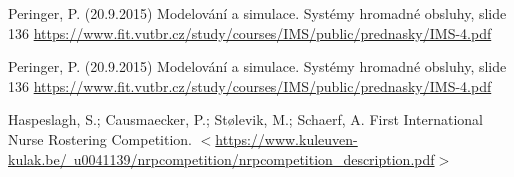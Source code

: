 \documentclass[a4paper, 14pt]{article}
\begin{document}
\begin{thebibliography}{9}
 	Peringer, P. (20.9.2015) Modelování a simulace. Systémy hromadné obsluhy, slide 136
	 \href{https://www.fit.vutbr.cz/study/courses/IMS/public/prednasky/IMS-4.pdf}{https://www.fit.vutbr.cz/study/courses/IMS/public/prednasky/IMS-4.pdf}	 

 	Peringer, P. (20.9.2015) Modelování a simulace. Systémy hromadné obsluhy, slide 136
	 \href{https://www.fit.vutbr.cz/study/courses/IMS/public/prednasky/IMS-4.pdf}{https://www.fit.vutbr.cz/study/courses/IMS/public/prednasky/IMS-4.pdf}

	Haspeslagh, S.; Causmaecker, P.; Stølevik, M.; Schaerf, A. First International Nurse Rostering Competition.
	 \href{https://www.kuleuven-kulak.be/~u0041139/nrpcompetition/nrpcompetition\_description.pdf}{$<$https://www.kuleuven-kulak.be/~u0041139/nrpcompetition/nrpcompetition\_description.pdf$>$}

	 
\end{thebibliography}


\end{document}
